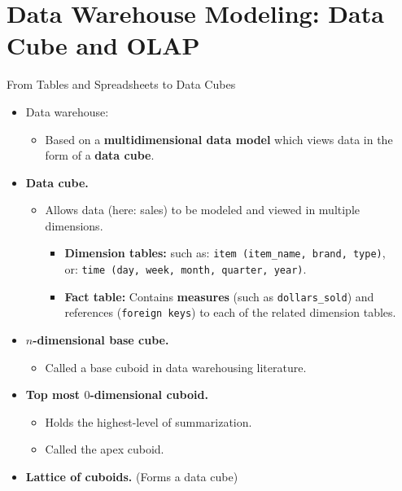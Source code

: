 \section{Data Warehouse Modeling: Data Cube and OLAP}

\begin{frame}{From Tables and Spreadsheets to Data Cubes}
  \begin{itemize}
  \item Data warehouse:
    \begin{itemize}
    \item Based on a \textbf{\color{airforceblue}multidimensional data model} which views data in the form of a \textbf{data cube}.
    \end{itemize}
  \item \textbf{Data cube.}
    \begin{itemize}
    \item Allows data (here: sales) to be modeled and viewed in multiple dimensions.
      \begin{itemize}
      \item \textbf{Dimension tables:} such as: \texttt{item (item\_name, brand, type)},\\
        or: \texttt{time (day, week, month, quarter, year)}.
      \item \textbf{Fact table:} Contains \textbf{measures} (such as \texttt{dollars\_sold}) and references (\texttt{foreign keys}) to each of the related dimension tables.
      \end{itemize}
    \end{itemize}
  \item \textbf{$n$-dimensional base cube.}
    \begin{itemize}
    \item Called a base cuboid in data warehousing literature.
    \end{itemize}
  \item \textbf{Top most $0$-dimensional cuboid.}
    \begin{itemize}
    \item Holds the highest-level of summarization.
    \item Called the apex cuboid.
    \end{itemize}
  \item \textbf{Lattice of cuboids.} (Forms a data cube)
  \end{itemize}
\end{frame}

